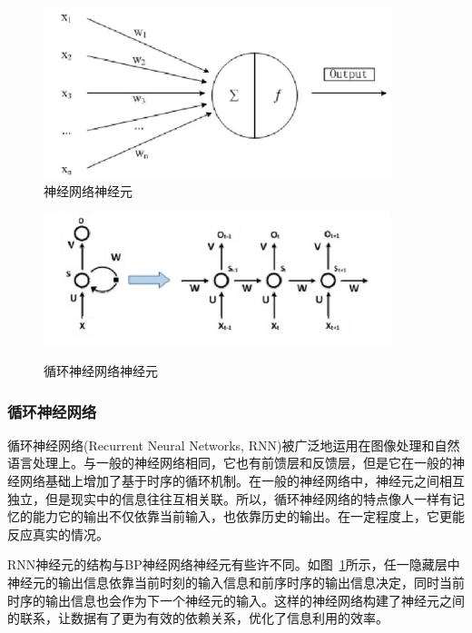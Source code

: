 \begin{figure}[b]
    \centering
    \begin{minipage}[t]{0.4\linewidth}
        \centering
        \includegraphics[width=0.9\textwidth]
        {figures/nnc.png}\\
        \caption{神经网络神经元}
        \label{fig:nnc}
    \end{minipage}
    \begin{minipage}[t]{0.5\linewidth}
        \centering
        \includegraphics[width=0.9\textwidth]
        {figures/rnnc.png}\\
        \caption{循环神经网络神经元}
        \label{fig:rnnc}
    \end{minipage}
\end{figure}

\subsubsection{循环神经网络}
循环神经网络(Recurrent Neural Networks, RNN)被广泛地运用在图像处理和自然语言处理上。与一般的神经网络相同，它也有前馈层和反馈层，但是它在一般的神经网络基础上增加了基于时序的循环机制。在一般的神经网络中，神经元之间相互独立，但是现实中的信息往往互相关联。所以，循环神经网络的特点像人一样有记忆的能力它的输出不仅依靠当前输入，也依靠历史的输出。在一定程度上，它更能反应真实的情况。

RNN神经元的结构与BP神经网络神经元有些许不同。如图~\ref{fig:rnnc}所示，任一隐藏层中神经元的输出信息依靠当前时刻的输入信息和前序时序的输出信息决定，同时当前时序的输出信息也会作为下一个神经元的输入。这样的神经网络构建了神经元之间的联系，让数据有了更为有效的依赖关系，优化了信息利用的效率。

